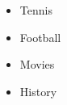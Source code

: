 \vspace{1em}
\begin{itemize}
    \item Tennis
    \item Football
    \item Movies
    \item History
\end{itemize}